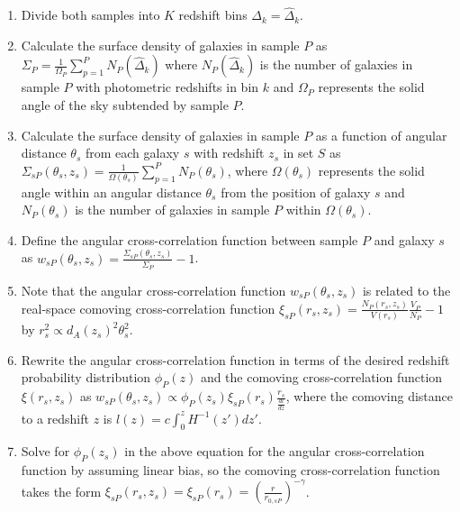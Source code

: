 \documentclass[12pt, onecolumn]{emulateapj}
\begin{document}
\begin{enumerate}
\item Divide both samples into $K$ redshift bins $\Delta_{k}=\hat{\Delta}_{k}$.

\item Calculate the surface density of galaxies in sample $P$ as $\Sigma_{P}=\frac{1}{\Omega_{P}}\sum_{p=1}^{P}N_{P}(\hat{\Delta}_{k})$ where $N_{P}(\hat{\Delta}_{k})$ is the number of galaxies in sample $P$ with photometric redshifts in bin $k$ and $\Omega_{P}$ represents the solid angle of the sky subtended by sample $P$.  

\item Calculate the surface density of galaxies in sample $P$ as a function of angular distance $\theta_{s}$ from each galaxy $s$ with redshift $z_{s}$ in set $S$ as $\Sigma_{sP}(\theta_{s},z_{s})=\frac{1}{\Omega(\theta_{s})}\sum_{p=1}^{P}N_{P}(\theta_{s})$, where $\Omega(\theta_{s})$ represents the solid angle within an angular distance $\theta_{s}$ from the position of galaxy $s$ and $N_{P}(\theta_{s})$ is the number of galaxies in sample $P$ within $\Omega(\theta_{s})$.

\item Define the angular cross-correlation function between sample $P$ and galaxy $s$ as $w_{sP}(\theta_{s},z_{s})=\frac{\Sigma_{sP}(\theta_{s},z_{s})}{\Sigma_{P}}-1$.

\item Note that the angular cross-correlation function $w_{sP}(\theta_{s},z_{s})$ is related to the real-space comoving cross-correlation function $\xi_{sP}(r_{s},z_{s})=\frac{N_{P}(r_{s},z_{s})}{V(r_{s})}\frac{V_{P}}{N_{P}}-1$ by $r_{s}^{2}\propto d_{A}(z_{s})^{2}\theta_{s}^{2}$.

\item Rewrite the angular cross-correlation function in terms of the desired redshift probability distribution $\phi_{P}(z)$ and the comoving cross-correlation function $\xi(r_{s},z_{s})$ as $w_{sP}(\theta_{s},z_{s})\propto\phi_{P}(z_{s})\xi_{sP}(r_{s})\frac{r_{s}}{\frac{dl}{dz}}$, where the comoving distance to a redshift $z$ is $l(z)=c\int_{0}^{z}H^{-1}(z')dz'$.

\item Solve for $\phi_{P}(z_{s})$ in the above equation for the angular cross-correlation function by assuming linear bias, so the comoving cross-correlation function takes the form $\xi_{sP}(r_{s},z_{s})=\xi_{sP}(r_{s})=(\frac{r}{r_{0,sP}})^{-\gamma}$.



\end{enumerate}
\end{document}

